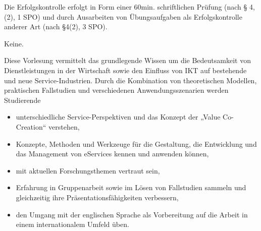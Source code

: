 \begin{course}

\setdoclanguagegerman
{}



\coursehead


\label{cour_6027.dp_997}


\begin{styleenv}
\begin{assessment}
Die Erfolgskontrolle erfolgt in Form einer 60min. schriftlichen Prüfung (nach § 4, (2), 1 SPO) und durch Ausarbeiten von Übungsaufgaben als Erfolgskontrolle anderer Art (nach §4(2), 3 SPO).


\end{assessment}

\begin{conditions}Keine.\end{conditions}


\end{styleenv}

\begin{learningoutcomes}
Diese Vorlesung vermittelt das grundlegende Wissen um die Bedeutsamkeit von Dienstleistungen in der Wirtschaft sowie den Einfluss von IKT auf bestehende und neue Service-Industrien. Durch die Kombination von theoretischen Modellen, praktischen Fallstudien und verschiedenen Anwendungsszenarien werden Studierende

 \begin{itemize}\item unterschiedliche Service-Perspektiven und das Konzept der „Value Co-Creation“ verstehen,  \item Konzepte, Methoden und Werkzeuge für die Gestaltung, die Entwicklung und das Management von eServices kennen und anwenden können,  \item mit aktuellen Forschungsthemen vertraut sein,  \item Erfahrung in Gruppenarbeit sowie im Lösen von Fallstudien sammeln und gleichzeitig ihre Präsentationsfähigkeiten verbessern,  \item den Umgang mit der englischen Sprache als Vorbereitung auf die Arbeit in einem internationalem Umfeld üben.  \end{itemize}
\end{learningoutcomes}


\end{course}

